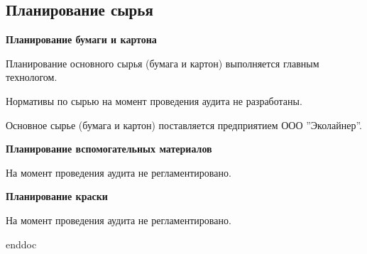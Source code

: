\newpage
\subsection{Планирование сырья}
\label{bp:RawMaterialPlanning}

\textbf{Планирование бумаги и картона}

Планирование основного сырья (бумага и картон) выполняется главным технологом. 

Нормативы по сырью на момент проведения аудита не разработаны. 

Основное сырье (бумага и картон) поставляется предприятием ООО ''Эколайнер''.







\textbf{Планирование вспомогательных материалов}

На момент проведения аудита не регламентировано.










\textbf{Планирование краски }

На момент проведения аудита не регламентировано.





\clearpage
 {enddoc}